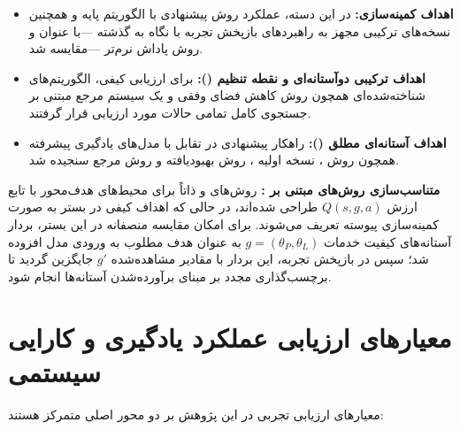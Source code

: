 \documentclass[oneside,openany,phd]{TMU-Thesis}
\begin{document}
\begin{itemize}
  \item \textbf{اهداف کمینه‌سازی:} در این دسته، عملکرد روش پیشنهادی با الگوریتم پایه  \cite{mnih2015human} و همچنین نسخه‌های ترکیبی  مجهز به راهبردهای بازپخش تجربه با نگاه به گذشته —با عنوان  \cite{andrychowicz2017her} و روش پاداش نرم‌تر  \cite{he2020softher}—مقایسه شد.
  \item \textbf{اهداف ترکیبی دوآستانه‌ای و نقطه تنظیم ():} برای ارزیابی کیفی، الگوریتم‌های شناخته‌شده‌ای همچون روش کاهش فضای وفقی  \cite{weyns2022deep} و یک سیستم مرجع مبتنی بر جستجوی کامل تمامی حالات مورد ارزیابی قرار گرفتند.
  \item \textbf{اهداف آستانه‌ای مطلق ():} راهکار پیشنهادی در تقابل با مدل‌های یادگیری پیشرفته همچون روش  \cite{quin2019efficient, quin2022reducing}، نسخه اولیه  \cite{vanderdonckt2020applying}، روش بهبودیافته  \cite{weyns2022deep} و روش مرجع سنجیده شد.
\end{itemize}

\textbf{متناسب‌سازی روش‌های مبتنی بر :} روش‌های  و  ذاتاً برای محیط‌های هدف‌محور با تابع ارزش $Q(s, g, a)$ طراحی شده‌اند، در حالی که اهداف کیفی در بستر  به صورت کمینه‌سازی پیوسته تعریف می‌شوند. برای امکان مقایسه منصفانه در این بستر، بردار آستانه‌های کیفیت خدمات $g = (\theta_P, \theta_L)$ به عنوان هدف مطلوب به ورودی مدل افزوده شد؛ سپس در بازپخش تجربه، این بردار با مقادیر مشاهده‌شده $g'$ جایگزین گردید تا برچسب‌گذاری مجدد بر مبنای برآورده‌شدن آستانه‌ها انجام شود.

\section{معیارهای ارزیابی عملکرد یادگیری و کارایی سیستمی}

معیارهای ارزیابی تجربی در این پژوهش بر دو محور اصلی متمرکز هستند:
\end{document}
